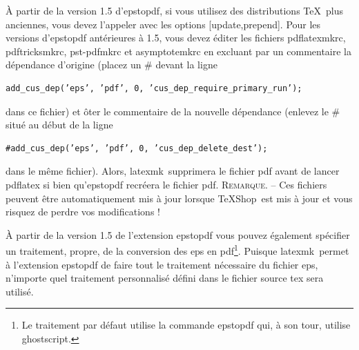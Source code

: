 \documentclass[11pt,french]{article}
\newcommand{\TS}{\textsf{\TeX Shop}}
\newcommand{\latexmk}{\textsf{latexmk}}
\newcommand{\cmd}[1]{\textsf{#1}}
\newcommand{\To}{\,\(\to\)\,}
\begin{document}
À partir de la version 1.5 d'\cmd{epstopdf}, si vous utilisez des distributions \TeX\ plus anciennes, vous devez l'appeler avec les options \cmd{[update,prepend]}. Pour les versions d'\cmd{epstopdf} antérieures à 1.5, vous devez éditer les fichiers \cmd{pdflatexmkrc}, \cmd{pdftricksmkrc}, \cmd{pst-pdfmkrc} et \cmd{asymptotemkrc} en excluant par un commentaire la dépendance d'origine (placez un \# devant la ligne
\begin{verbatim}
add_cus_dep(’eps’, ’pdf’, 0, ’cus_dep_require_primary_run’);
\end{verbatim}
dans ce fichier) et ôter le commentaire de la nouvelle dépendance (enlevez le \# situé au début de la ligne
\begin{verbatim}
#add_cus_dep(’eps’, ’pdf’, 0, ’cus_dep_delete_dest’);
\end{verbatim}
dans le même fichier). Alors, \latexmk\ supprimera le fichier \cmd{pdf} avant de lancer \cmd{pdflatex} si bien qu'\cmd{epstopdf} recréera le fichier \cmd{pdf}. \textsc{Remarque}. -- Ces fichiers peuvent être automatiquement mis à jour lorsque \TS\ est mis à jour et vous risquez de perdre vos modifications !

À partir de la version 1.5 de l'extension \cmd{epstopdf} vous pouvez également spécifier un traitement, propre, de la conversion des \cmd{eps} en \cmd{pdf}\footnote{Le traitement par défaut utilise la commande \cmd{epstopdf} qui, à son tour, utilise \cmd{ghostscript}.}. Puisque \latexmk\ permet à l'extension \cmd{epstopdf} de faire tout le traitement nécessaire du fichier \cmd{eps}, n'importe quel traitement personnalisé défini dans le fichier source \cmd{tex} sera utilisé.

%
\end{document}
